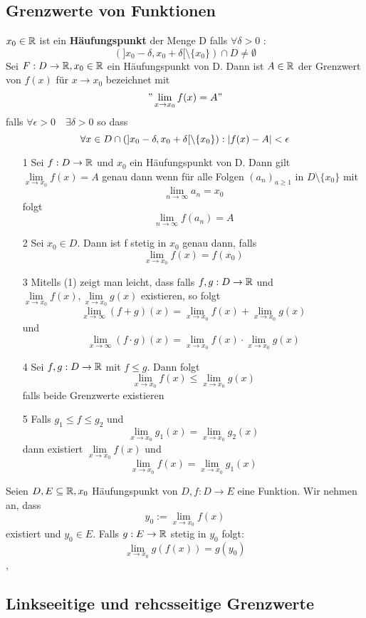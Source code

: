 \subsection{Grenzwerte von Funktionen}
 \(x_0 \in \mathbb{R} \) ist ein \textbf{Häufungspunkt} der Menge D falls \( \forall \delta > 0\) : 
\[ (]x_0 - \delta, x_0 + \delta [ \setminus \{x_0\}) \cap D \neq \emptyset \]
 Sei \( F: D \rightarrow \mathbb{R}, x_0 \in \mathbb{R} \) ein Häufungspunkt von D. Dann ist \(A \in \mathbb{R} \) der Grenzwert von \(f(x)\) für \(x \rightarrow x_0\) bezeichnet mit
\["\lim\limits_{x \rightarrow x_0} f(x) = A"\]
falls \( \forall \epsilon > 0 \quad \exists \delta > 0\) so dass
\[ \forall x \in D \cap (] x_0 - \delta, x_0 + \delta [ \setminus \{x_0\}) : \left\lvert f(x) - A  \right\rvert < \epsilon\]
\begin{enumerate}
    \item [1] Sei \(f : D \rightarrow \mathbb{R} \) und \(x_0\) ein Häufungspunkt von D. Dann gilt \(\lim\limits_{x \rightarrow x_0} f(x) = A \) genau dann wenn für alle Folgen \((a_n)_{a \geq 1 }\) in \(D \setminus \{x_0\}\) mit
    \[ \lim\limits_{n \rightarrow \infty} a_n = x_0  \]
    folgt
    \[ \lim\limits_{n \rightarrow \infty} f(a_n) = A \]
    \item [2] Sei \(x_0 \in D. \) Dann ist f stetig in \(x_0\) genau dann, falls
    \[ \lim\limits_{x \rightarrow x_0} f(x) = f(x_0)\]
    \item [3] Mitells (1) zeigt man leicht, dass falls \(f,g : D \rightarrow \mathbb{R} \) und \( \lim\limits_{x \rightarrow x_0} f(x), \lim\limits_{x \rightarrow x_0} g(x)\) existieren, so folgt
    \[\lim\limits_{x \rightarrow \infty}(f + g)(x) = \lim\limits_{x \rightarrow x_0} f(x) + \lim\limits_{x \rightarrow x_0} g(x)\]
    und
    \[\lim\limits_{x \rightarrow \infty}(f \cdot g)(x) = \lim\limits_{x \rightarrow x_0} f(x) \cdot \lim\limits_{x \rightarrow x_0} g(x)\]
    \item [4] Sei \(f,g : D \rightarrow \mathbb{R} \) mit \(f \leq g \). Dann folgt
    \[\lim\limits_{x \rightarrow x_0} f(x) \leq \lim\limits_{x \rightarrow x_0} g(x)\]
    falls beide Grenzwerte existieren
    \item [5] Falls \(g_1 \leq f \leq g_2\) und
    \[ \lim\limits_{x \rightarrow x_0} g_1(x) = \lim\limits_{x \rightarrow x_0} g_2(x)\]
    dann existiert \(\lim\limits_{x \rightarrow x_0} f(x)\) und
    \[ \lim\limits_{x \rightarrow x_0} f(x) = \lim\limits_{x \rightarrow x_0} g_1(x )\]
\end{enumerate}
 Seien \(D,E \subseteq \mathbb{R}, x_0 \) Häufungspunkt von \(D, f: D \rightarrow E \) eine Funktion. Wir nehmen an, dass
\[y_0 := \lim\limits_{x \rightarrow x_0} f(x)\]
existiert und \(y_0 \in E.\) Falls \(g: E \rightarrow \mathbb{R} \) stetig in \(y_0\) folgt:
\[ \lim\limits_{x \rightarrow x_0} g(f(x)) = g(y_0)\]
\sep
\subsection{Linkseeitige und rehcsseitige Grenzwerte}